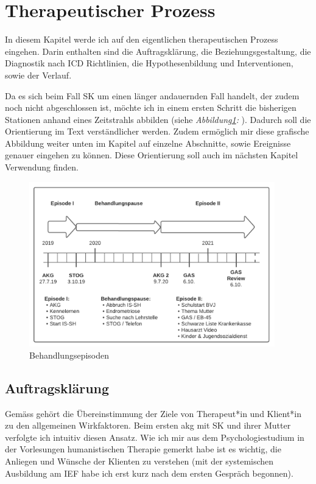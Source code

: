 \section{Therapeutischer Prozess}\label{Prozess}
In diesem Kapitel werde ich auf den eigentlichen therapeutischen Prozess eingehen. Darin enthalten sind die Auftragsklärung, die Beziehungsgestaltung, die Diagnostik nach ICD Richtlinien, die Hypothesenbildung und Interventionen, sowie der Verlauf.   

Da es sich beim Fall SK um einen länger andauernden Fall handelt, der zudem noch nicht abgeschlossen ist, möchte ich in einem ersten Schritt die bisherigen Stationen anhand eines Zeitstrahls abbilden (siehe \textit{Abbildung\ref{fig:Behanldungsepisode}: }). Dadurch soll die Orientierung im Text verständlicher werden. Zudem ermöglich mir diese grafische Abbildung weiter unten im Kapitel  auf einzelne Abschnitte, sowie Ereignisse genauer eingehen zu können. Diese Orientierung soll auch im nächsten Kapitel  Verwendung finden. 

\begin{figure} 
    \includegraphics[width=0.95\textwidth]{pictures/Zeitstrahl_Fall_SK.png}
    \caption{Behandlungsepisoden}
    \label{fig:Behanldungsepisode}
\end{figure}

\subsection{Auftragsklärung}\label{Auftragsklärung} 
Gemäss  gehört die Übereinstimmung der Ziele von Therapeut*in und Klient*in zu den allgemeinen Wirkfaktoren. Beim ersten \acf{akg} mit SK und ihrer Mutter verfolgte ich intuitiv diesen Ansatz. Wie ich mir aus dem Psychologiestudium in der Vorlesungen humanistischen Therapie gemerkt habe ist es wichtig, die Anliegen und Wünsche der Klienten zu verstehen (mit der systemischen Ausbildung am IEF habe ich erst kurz nach dem ersten Gespräch begonnen). 


